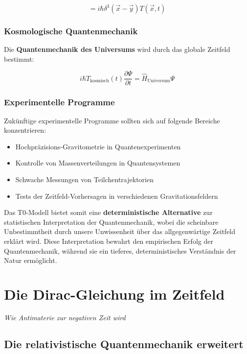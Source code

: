 \documentclass[12pt,a4paper]{report}
\begin{document}
	\begin{equation}
		[\hat{\phi}(\vec{x},t), \hat{\pi}(\vec{y},t)] = i\hbar\delta^3(\vec{x}-\vec{y})T(\vec{x},t)
	\end{equation}
	
	\subsection{Kosmologische Quantenmechanik}
	
	Die \textbf{Quantenmechanik des Universums} wird durch das globale Zeitfeld bestimmt:
	
	\begin{equation}
		i\hbar T_{\text{kosmisch}}(t)\frac{\partial\Psi}{\partial t} = \hat{H}_{\text{Universum}}\Psi
	\end{equation}
	
	\subsection{Experimentelle Programme}
	
	Zukünftige experimentelle Programme sollten sich auf folgende Bereiche konzentrieren:
	\begin{itemize}
		\item Hochpräzisions-Gravitometrie in Quantenexperimenten
		\item Kontrolle von Massenverteilungen in Quantensystemen
		\item Schwache Messungen von Teilchentrajektorien
		\item Tests der Zeitfeld-Vorhersagen in verschiedenen Gravitationsfeldern
	\end{itemize}
	
	Das T0-Modell bietet somit eine \textbf{deterministische Alternative} zur statistischen Interpretation der Quantenmechanik, wobei die scheinbare Unbestimmtheit durch unsere Unwissenheit über das allgegenwärtige Zeitfeld erklärt wird. Diese Interpretation bewahrt den empirischen Erfolg der Quantenmechanik, während sie ein tieferes, deterministisches Verständnis der Natur ermöglicht.
	\chapter{Die Dirac-Gleichung im Zeitfeld}
\textit{Wie Antimaterie zur negativen Zeit wird}

\section{Die relativistische Quantenmechanik erweitert}
\end{document}
